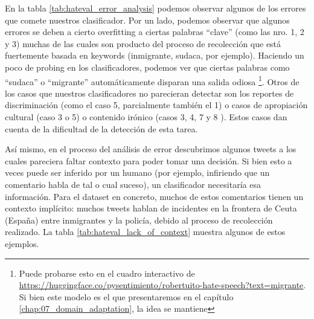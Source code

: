 En la tabla \ref{tab:hateval_error_analysis} podemos observar algunos de los errores que comete nuestros clasificador. Por un lado, podemos observar que algunos errores se deben a cierto overfitting a ciertas palabras ``clave'' (como las nro. 1, 2 y 3) muchas de las cuales son producto del proceso de recolección que está fuertemente basada en keywords (inmigrante, sudaca, por ejemplo). Haciendo un poco de probing en los clasificadores, podemos ver que ciertas palabras como ``sudaca'' o ``migrante'' automáticamente disparan una salida odiosa \footnote{Puede probarse esto en el cuadro interactivo de \url{https://huggingface.co/pysentimiento/robertuito-hate-speech?text=migrante}. Si bien este modelo es el que presentaremos en el capítulo \ref{chap:07_domain_adaptation}, la idea se mantiene}. Otros de los casos que nuestros clasificadores no parecieran detectar son los reportes de discriminación (como el caso 5, parcialmente también el 1) o casos de apropiación cultural (caso 3 o 5) o contenido irónico (casos 3, 4, 7 y 8 ). Estos casos dan cuenta de la dificultad de la detección de esta tarea.

Así mismo, en el proceso del análisis de error descubrimos algunos tweets a los cuales pareciera faltar contexto para poder tomar una decisión. Si bien esto a veces puede ser inferido por un humano (por ejemplo, infiriendo que un comentario habla de tal o cual suceso), un clasificador necesitaría esa información. Para el dataset en concreto, muchos de estos comentarios tienen un contexto implícito: muchos tweets hablan de incidentes en la frontera de Ceuta (España) entre inmigrantes y la policía, debido al proceso de recolección realizado. La tabla \ref{tab:hateval_lack_of_context} muestra algunos de estos ejemplos.



